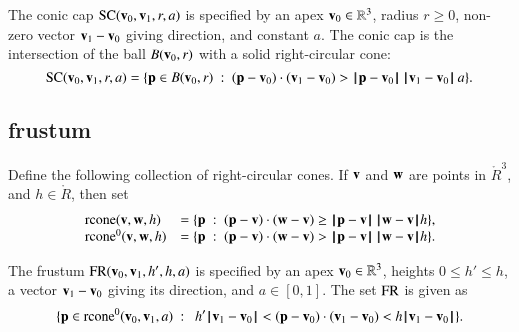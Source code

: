 
\begin{definition}
The conic cap $\op{SC}(\v_0,\v_1,r,a)$ is specified by an apex
$\v_0\in\ring{R}^3$,  radius $r\ge0$,  non-zero vector $\v_1-\v_0$ giving
direction, and constant $a$.  The conic cap is the intersection of
the ball $B(\v_0,r)$ with a solid right-circular cone:
\begin{displaymath}
\op{SC}(\v_0,\v_1,r,a)=\{\p \in B(\v_0,r) 
\mid (\p-\v_0)\cdot (\v_1-\v_0) > \norm{\p}{\v_0}\, \norm{\v_1}{\v_0}\, a\}.
\end{displaymath}
%
%
%
%
\end{definition}

\subsection{frustum}
%

\begin{definition}[rcone]
%
Define the following collection of right-circular cones.
If $\v$ and $\w$ are points in $\ring{R}^3$, and
$h\in\ring{R}$, then set
\begin{displaymath}\begin{array}{lll}
\op{rcone}(\v,\w,h) 
&= \{\p\mid (\p-\v)\cdot (\w-\v) \ge \norm{\p}{\v}\,\norm{\w}{\v} h\},\\
\op{rcone}^0(\v,\w,h) 
&= \{\p\mid (\p-\v)\cdot (\w-\v) > \norm{\p}{\v}\,\norm{\w}{\v} h\}.\\
\end{array}
\end{displaymath}
\end{definition}
%
%
%
%


\begin{definition}[frustum, FR] The frustum
$\op{FR}(\v_0,\v_1,h',h,a)$ is specified by an apex
$\v_0\in\ring{R}^3$, heights $0\le h'\le h$, a vector $\v_1-\v_0$
giving its direction, and $a\in[0,1]$. The set $\op{FR}$ is given as
\begin{displaymath}
\{ \p \in\op{rcone}^0(\v_0,\v_1,a) \mid \ 
h'\norm{\v_1}{\v_0} < (\p-\v_0) \cdot (\v_1-\v_0) < h\norm{\v_1}{\v_0} \}.
\end{displaymath}
%
%
%
\end{definition}

